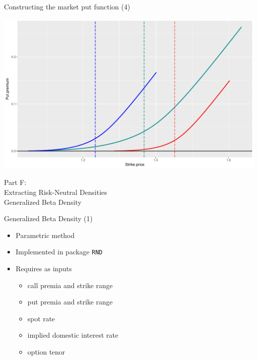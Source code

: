 \begin{frame}{Constructing the market put function (4)}

\includegraphics[width=0.9\linewidth]{2018_02_07_IMF_FXCourse_files/figure-beamer/unnamed-chunk-48-1}

\end{frame}

\begin{frame}{}

\color{blue} \LARGE{Part F:}\\
\LARGE{Extracting Risk-Neutral Densities}\\
\Large{Generalized Beta Density}

\end{frame}

\begin{frame}[fragile]{Generalized Beta Density (1)}

\begin{itemize}
\tightlist
\item
  Parametric method
\item
  Implemented in package \texttt{RND}
\item
  Requires as inputs

  \begin{itemize}
  \tightlist
  \item
    call premia and strike range
  \item
    put premia and strike range
  \item
    spot rate
  \item
    implied domestic interest rate
  \item
    option tenor
  \end{itemize}
\end{itemize}

\end{frame}

